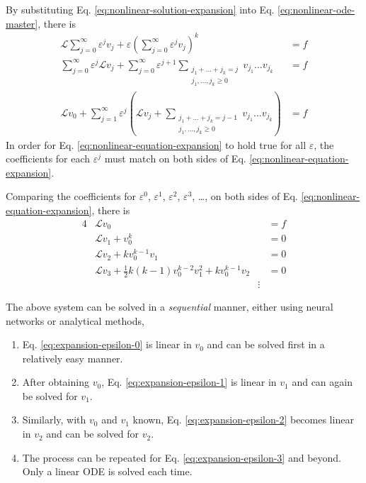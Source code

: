 \documentclass{article}
\renewcommand{\L}{\mathcal{L}}
\begin{document}
    By substituting Eq. \ref{eq:nonlinear-solution-expansion} into Eq. \ref{eq:nonlinear-ode-master}, there is
    \begin{align}
        \L \sum_{j=0}^{\infty} \varepsilon^j v_j + \varepsilon \left(\sum_{j=0}^{\infty} \varepsilon^j v_j\right)^k &= f \\
        \sum_{j=0}^{\infty} \varepsilon^j \L v_j + \sum_{j=0}^{\infty} \varepsilon^{j+1} \sum_{\substack{j_1+\dots+j_k = j\\j_1, \dots, j_k \geq 0}}v_{j_1}\dots v_{j_k} &= f \\ 
        \L v_0 + \sum_{j=1}^{\infty} \varepsilon^j \left(\L v_j + \sum_{\substack{j_1+\dots+j_k = j - 1\\j_1, \dots, j_k \geq 0}}v_{j_1}\dots v_{j_k}\right)&= f \label{eq:nonlinear-equation-expansion} 
    \end{align}
    In order for Eq. \ref{eq:nonlinear-equation-expansion} to hold true for all $\varepsilon$, the coefficients for each $\varepsilon^j$ must match on both sides of Eq. \ref{eq:nonlinear-equation-expansion}.

    Comparing the coefficients for $\varepsilon^0$, $\varepsilon^1$, $\varepsilon^2$, $\varepsilon^3$, \dots, on both sides of Eq. \ref{eq:nonlinear-equation-expansion}, there is
    \begin{alignat}{4}
        &\L v_0 &&= f \label{eq:expansion-epsilon-0}\\
        &\L v_1 + v_0^k &&= 0 \label{eq:expansion-epsilon-1}\\
        &\L v_2 + k v_0^{k-1}v_1 &&= 0 \label{eq:expansion-epsilon-2} \\
        &\L v_3 + \frac{1}{2}k(k-1)v_0^{k-2}v_1^2 + k v_0^{k-1}v_2 &&= 0 \label{eq:expansion-epsilon-3}\\
        &&\vdots &\nonumber
    \end{alignat}

    The above system can be solved in a \textit{sequential} manner, either using neural networks or analytical methods,
    \begin{enumerate}
        \item Eq. \ref{eq:expansion-epsilon-0} is linear in $v_0$ and can be solved first in a relatively easy manner. 
        \item After obtaining $v_0$, Eq. \ref{eq:expansion-epsilon-1} is linear in $v_1$ and can again be solved for $v_1$. 
        \item Similarly, with $v_0$ and $v_1$ known, Eq. \ref{eq:expansion-epsilon-2} becomes linear in $v_2$ and can be solved for $v_2$.
        \item The process can be repeated for Eq. \ref{eq:expansion-epsilon-3} and beyond. Only a linear ODE is solved each time.
    \end{enumerate}
\end{document}
